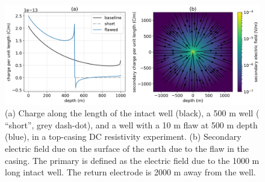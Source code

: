 \begin{figure}
    \begin{center}
    \includegraphics[width=\textwidth]{figures/dc_casing/casing_charge.png}
    \end{center}
\caption{
    (a) Charge along the length of the intact well (black),
    a 500 m well ( ``short'', grey dash-dot), and
    a well with a 10 m flaw at 500 m depth (blue),
    in a top-casing DC resistivity experiment.
    (b) Secondary electric field due on the surface of the earth due to the
    flaw in the casing. The primary is
    defined as the electric field due to the 1000 m long intact well. The return electrode
    is 2000 m away from the well.
}
\label{fig:casing_charge}
\end{figure}
